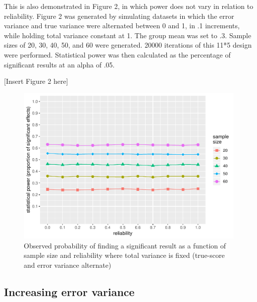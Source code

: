\documentclass[english,,man]{apa6}
\begin{document}
This is also demonstrated in Figure 2, in which power does not vary in relation to reliability. Figure 2 was generated by simulating datasets in which the error variance and true variance were alternated between 0 and 1, in .1 increments, while holding total variance constant at 1. The group mean was set to .3. Sample sizes of 20, 30, 40, 50, and 60 were generated. 20000 iterations of this 11*5 design were performed. Statistical power was then calculated as the percentage of significant results at an alpha of .05.

\begin{center}
  
  [Insert Figure 2 here]
  
  \end{center}

\begin{figure}[H]
\includegraphics{visualising_reliability_and_power_relationships_v2_files/figure-latex/plotting2-1} \caption{Observed probability of finding a significant result as a function of sample size and reliability where total variance is fixed (true-score and error variance alternate)}\label{fig:plotting2}
\end{figure}

\hypertarget{increasing-error-variance}{%
\subsection{Increasing error variance}\label{increasing-error-variance}}
\end{document}
